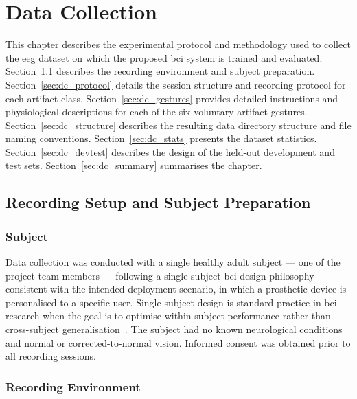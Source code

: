 \chapter{Data Collection}
\label{ch:data_collection}

This chapter describes the experimental protocol and methodology
used to collect the \acrshort{eeg} dataset on which the proposed
\acrshort{bci} system is trained and evaluated.
Section~\ref{sec:dc_setup} describes the recording environment
and subject preparation. Section~\ref{sec:dc_protocol} details
the session structure and recording protocol for each artifact
class. Section~\ref{sec:dc_gestures} provides detailed instructions
and physiological descriptions for each of the six voluntary
artifact gestures. Section~\ref{sec:dc_structure} describes the
resulting data directory structure and file naming conventions.
Section~\ref{sec:dc_stats} presents the dataset statistics.
Section~\ref{sec:dc_devtest} describes the design of the held-out
development and test sets. Section~\ref{sec:dc_summary} summarises
the chapter.

\section{Recording Setup and Subject Preparation}
\label{sec:dc_setup}

\subsection{Subject}

Data collection was conducted with a single healthy adult subject
--- one of the project team members --- following a single-subject
\acrshort{bci} design philosophy consistent with the intended
deployment scenario, in which a prosthetic device is personalised
to a specific user. Single-subject design is standard practice
in \acrshort{bci} research when the goal is to optimise
within-subject performance rather than cross-subject
generalisation~\cite{lotte2007review}. The subject had no known
neurological conditions and normal or corrected-to-normal vision.
Informed consent was obtained prior to all recording sessions.

\subsection{Recording Environment}

